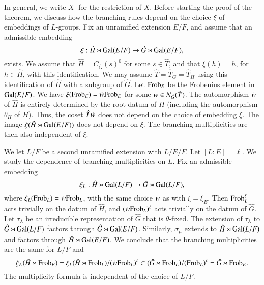 In general, we write $X|$ for the restriction of $X$.
Before starting the proof of the theorem, we discuss how the branching rules depend on the choice $\xi$ of embeddings
of $L$-groups.
Fix an unramified extension $E/F$, and assume that an admissible embedding
\[
\xi:\hat H \rtimes {\operatorname{Gal}}(E/F)\to \hat G \rtimes {\operatorname{Gal}}(E/F),
\]
exists.  
We assume that $\hat H = C_{\hat G}(s)^0$ for some $s\in \hat T$, and that $\xi(h) = h$, for $h \in \hat H$,
with this identification.  We may assume $\hat T = \hat T_G = \hat T_H$ using this identification of $\hat H$ with a subgroup of $\hat G$.
Let ${\operatorname{Frob}}_{E}$ be the Frobenius element in ${\operatorname{Gal}}(E/F)$.
We have $\xi({\operatorname{Frob}}_{E}) = \dot w {\operatorname{Frob}}_E$ for some $\dot w \in N_{\hat G}(\hat T)$.  The automorphism $\dot w $ of $\hat H$ is entirely determined
by the root datum of $H$ (including the automorphism $\theta_H$ of $H$).  Thus, the coset $\hat T \dot w $ does not
depend on the choice of embedding $\xi$.  The image $\xi(\hat H\rtimes {\operatorname{Gal}}(E/F))$ does not depend on $\xi$.
The branching multiplicities are then also independent of $\xi$.

We let $L/F$ be a second unramified extension with $L/E/F$.  Let  $[L:E]=\ell$.  We study the  dependence
of branching multiplicities on $L$.  Fix an admissible embedding
\[
\xi_L:\hat H \rtimes {\operatorname{Gal}}(L/F)\to \hat G \rtimes {\operatorname{Gal}}(L/F),
\]
where $\xi_L({\operatorname{Frob}}_L) = \dot w  {\operatorname{Frob}}_L$, with the same choice $\dot w $ as with $\xi = \xi_E$.
Then ${\operatorname{Frob}}_L^\ell$ acts trivially on the datum of $\hat H$, and $(\dot w  {\operatorname{Frob}}_L)^\ell$ acts trivially on the datum of $\hat G$.
Let $\tau_\lambda$ be an irreducible representation of $\hat G$ that is $\theta$-fixed.  The extension of 
$\tau_\lambda$ to $\hat G\rtimes {\operatorname{Gal}}(L/F)$ factors through $\hat G\rtimes {\operatorname{Gal}}(E/F)$.
Similarly, $\sigma_\mu$ extends to $\hat H\rtimes {\operatorname{Gal}}(L/F)$ and factors through $\hat H\rtimes{\operatorname{Gal}}(E/F)$.
We conclude that the branching multiplicities are the same for $L/F$ and
\[
\xi_E(\hat H \rtimes {\operatorname{Frob}}_E) = \xi_L(\hat H\rtimes {\operatorname{Frob}}_L)/(\dot w {\operatorname{Frob}}_L)^\ell \subset (\hat G\rtimes {\operatorname{Frob}}_L)/( {\operatorname{Frob}}_L)^\ell = \hat G\rtimes {\operatorname{Frob}}_E.
\]
The multiplicity formula is independent of the choice of $L/F$.


